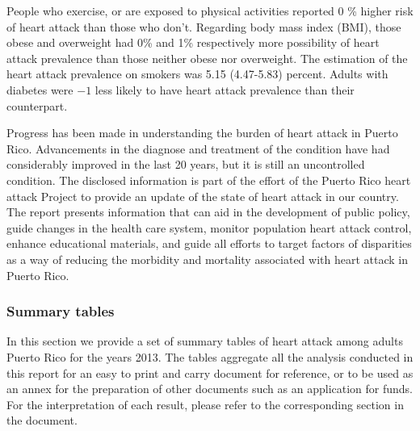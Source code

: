 People who exercise, or are exposed to physical activities reported 0 \% higher risk of heart attack than those who don't.  Regarding body mass index (BMI), those obese and overweight had 0\% and 1\% respectively more possibility of heart attack prevalence than those neither obese nor overweight. The estimation of the heart attack prevalence on smokers was 5.15 (4.47-5.83) percent.  Adults with diabetes were \ensuremath{-1}\5 less likely to have heart attack prevalence than their counterpart.



Progress has been made in understanding the burden of heart attack in Puerto Rico. Advancements in the diagnose and treatment of the condition have had considerably improved in the last 20 years, but it is still an uncontrolled condition. The disclosed information is part of the effort of the Puerto Rico heart attack Project to provide an update of the state of heart attack in our country. The report presents information that can aid in the development of public policy, guide changes in the health care system, monitor population heart attack control, enhance educational materials, and guide all efforts to target factors of disparities as a way of reducing the morbidity and mortality associated with heart attack in Puerto Rico.

\newpage
\subsubsection{Summary tables}
In this section we provide a set of summary tables of heart attack among adults Puerto Rico for the years 2013. The tables aggregate all the analysis conducted in this report for an easy to print and carry document for reference, or to be used as an annex for the preparation of other documents such as an application for funds. For the interpretation of each result, please refer to the corresponding section in the document.

